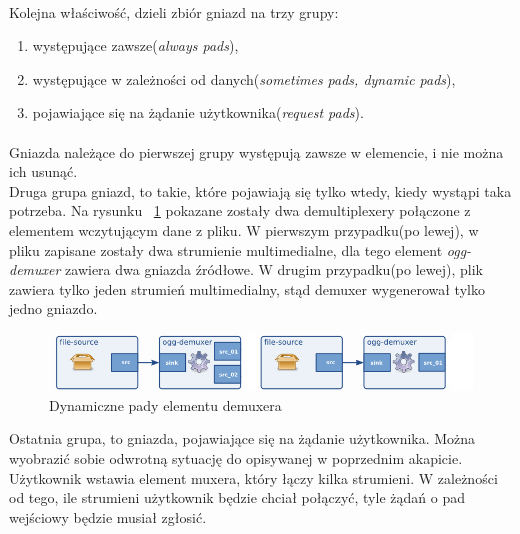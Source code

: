 \documentclass{article}
\begin{document}
\paragraph{}
Kolejna właściwość, dzieli zbiór gniazd na trzy grupy:
\begin{enumerate}
  \item występujące zawsze(\textit{always pads}),
  \item występujące w zależności od danych(\textit{sometimes pads, dynamic pads}),
  \item pojawiające się na żądanie użytkownika(\textit{request pads}).
\end{enumerate}
\paragraph{}
Gniazda należące do pierwszej grupy występują zawsze w elemencie, i nie można ich usunąć.\\
Druga grupa gniazd, to takie, które pojawiają się tylko wtedy, kiedy wystąpi taka potrzeba. Na rysunku ~\ref{fig:requestPadsDemux} pokazane zostały dwa demultiplexery połączone z elementem wczytującym dane z pliku. W pierwszym przypadku(po lewej), w pliku zapisane zostały dwa strumienie multimedialne, dla tego element \textit{ogg-demuxer} zawiera dwa gniazda źródłowe. W drugim przypadku(po lewej), plik zawiera tylko jeden strumień multimedialny, stąd demuxer wygenerował tylko jedno gniazdo.
\begin{figure}[H]
  \includegraphics[width=150mm]{img/request-pads-demux.png}
  \caption{Dynamiczne pady elementu demuxera}
  \label{fig:requestPadsDemux}
\end{figure}
Ostatnia grupa, to gniazda, pojawiające się na żądanie użytkownika. Można wyobrazić sobie odwrotną sytuację do opisywanej w poprzednim akapicie. Użytkownik wstawia element muxera, który łączy kilka strumieni. W zależności od tego, ile strumieni użytkownik będzie chciał połączyć, tyle żądań o pad wejściowy będzie musiał zgłosić.
\end{document}
